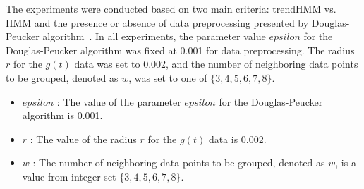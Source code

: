 \documentclass[preprint,12pt]{elsarticle}
\begin{document}

The experiments were conducted based on two main criteria: trendHMM vs. HMM and the presence or absence of data preprocessing presented by Douglas-Peucker algorithm~\cite{saalfeld1999topologically}. In all experiments, the parameter value $epsilon$ for the Douglas-Peucker algorithm was fixed at 0.001 for data preprocessing. The radius $r$ for the $g(t)$ data was set to 0.002, and the number of neighboring data points to be grouped, denoted as $w$, was set to one of $\{3, 4, 5, 6, 7, 8\}$.
\begin{itemize}
	\item $epsilon$ : The value of the parameter $epsilon$ for the Douglas-Peucker algorithm is 0.001.
	\item $r$ : The value of the radius $r$ for the $g(t)$ data is 0.002.
	\item $w$ : The number of neighboring data points to be grouped, denoted as $w$, is a value from integer set $\{3, 4, 5, 6, 7, 8\}$.
\end{itemize}
\end{document}

